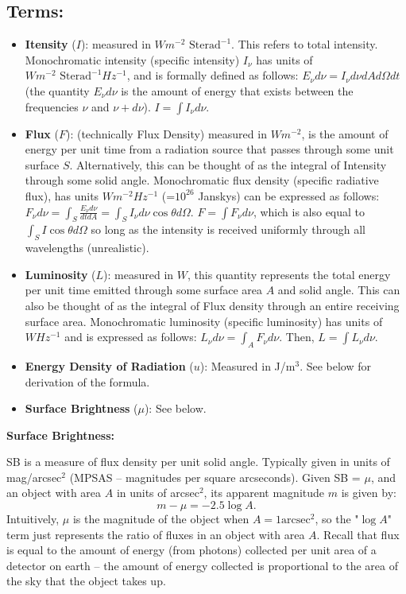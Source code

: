 \documentclass[12pt]{article}
\begin{document}
\subsection{Terms:}
\begin{itemize}
\item \textbf{Itensity} ($I$): measured in $Wm^{-2}\text{ Sterad}^{-1}$. This refers to total intensity. Monochromatic intensity (specific intensity) $I_\nu$ has units of $Wm^{-2}\text{ Sterad}^{-1}Hz^{-1}$, and is formally defined as follows: $E_{\nu}d\nu = I_{\nu} d\nu dA d\Omega dt$ (the quantity $E_{\nu}d\nu$ is the amount of energy that exists between the frequencies $\nu$ and $\nu + d\nu$). $I = \int I_{\nu}d\nu$.
\item \textbf{Flux} ($F$): (technically Flux Density) measured in $Wm^{-2}$, is the amount of energy per unit time from a radiation source that passes through some unit surface $S$. Alternatively, this can be thought of as the integral of Intensity through some solid angle. Monochromatic flux density (specific radiative flux), has units $Wm^{-2}Hz^{-1}$ (=$10^{26}$ Janskys) can be expressed as follows: $F_{\nu} d\nu = \int_S \frac{E_{\nu}d\nu}{dt dA} = \int_S I_{\nu}d\nu \cos{\theta} d\Omega$. $F = \int F_{\nu}d\nu$, which is also equal to $\int_S I\cos{\theta}d\Omega$ so long as the intensity is received uniformly through all wavelengths (unrealistic).
\item \textbf{Luminosity} ($L$): measured in $W$, this quantity represents the total energy per unit time emitted through some surface area $A$ and solid angle. This can also be thought of as the integral of Flux density through an entire receiving surface area. Monochromatic luminosity (specific luminosity) has units of $WHz^{-1}$ and is expressed as follows: $L_{\nu}d\nu = \int_A F_{\nu}d\nu$. Then, $L = \int L_{\nu}d\nu$.
\item \textbf{Energy Density of Radiation} ($u$): Measured in J/m$^3$. See below for derivation of the formula.
\item \textbf{Surface Brightness} ($\mu$): See below.
\end{itemize}

\textbf{Surface Brightness:}

SB is a measure of flux density per unit solid angle. Typically given in units of mag/arcsec$^2$ (MPSAS -- magnitudes per square arcseconds). Given SB = $\mu$, and an object with area $A$ in units of arcsec$^2$, its apparent magnitude $m$ is given by:
\[m - \mu = -2.5\log{A}.\]
Intuitively, $\mu$ is the magnitude of the object when $A = 1\text{arcsec}^2$, so the "$\log{A}$" term just represents the ratio of fluxes in an object with area $A$. Recall that flux is equal to the amount of energy (from photons) collected per unit area of a detector on earth -- the amount of energy collected is proportional to the area of the sky that the object takes up.
\end{document}
